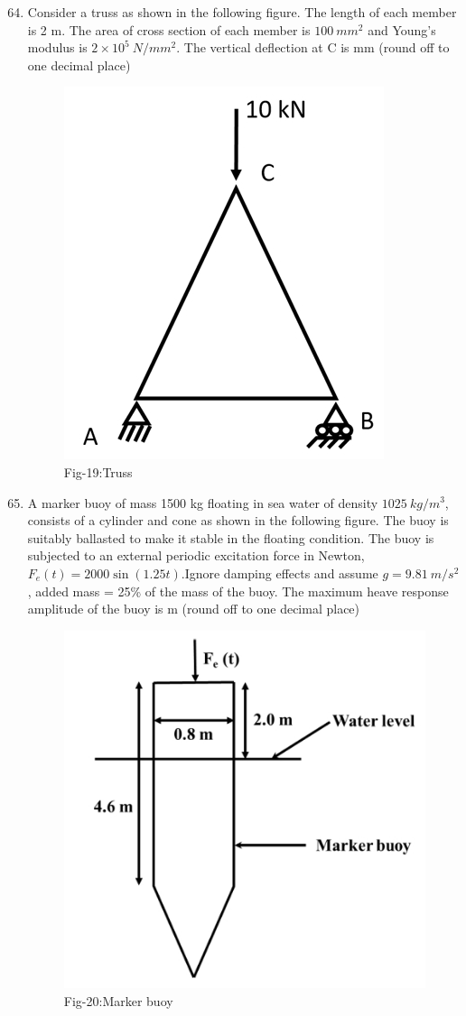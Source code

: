 \documentclass[journal]{IEEEtran}
\theoremstyle{remark}
\begin{document}
\begin{enumerate}[itemsep=1em]
\setcounter{enumi}{63}
\item Consider a truss as shown in the following figure. The length of each member is 2 m. The area of cross section of each member is $100\ mm^2$ and Young's modulus is $2 \times 10^5\ N/mm^2$. The vertical deflection at C is \underline{\hspace{2cm}} mm (round off to one decimal place)
\begin{figure}[H]
    \centering
    \includegraphics[width=0.4\columnwidth]{figs/fig-19.jpeg}
    \caption*{Fig-19:Truss}
    \label{fig-19}
\end{figure}
\end{enumerate}
\newpage
\vspace*{0.25cm}
\begin{enumerate}[itemsep=1em]
\setcounter{enumi}{64}
\item A marker buoy of mass 1500 kg floating in sea water of density $1025\ kg/m^3$, consists of a cylinder and cone as shown in the following figure. The buoy is suitably ballasted to make it stable in the floating condition. The buoy is subjected to an external periodic excitation force in Newton, $F_e(t)=2000\sin(1.25t)$.Ignore damping effects and assume $g = 9.81\ m/s^2$, added mass = 25\% of the mass of the buoy. The maximum heave response amplitude of the buoy is \underline{\hspace{1cm}} m (round off to one decimal place) 
\begin{figure}[H]
    \centering
    \includegraphics[width=0.4\columnwidth]{figs/fig-20.jpeg}
    \caption*{Fig-20:Marker buoy}
    \label{fig-20}
\end{figure}
\end{enumerate}
\end{document}
